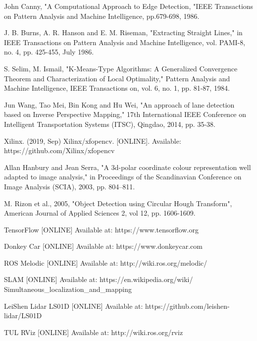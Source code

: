 \documentclass[conference]{IEEEtran}
\begin{document}
\begin{sloppypar}
\begin{thebibliography}{00}
 John Canny, "A Computational Approach to Edge Detection, "IEEE Transactions on Pattern Analysis and Machine Intelligence, pp.679-698, 1986.

 J. B. Burns, A. R. Hanson and E. M. Riseman, "Extracting Straight Lines," in IEEE Transactions on Pattern Analysis and Machine Intelligence, vol. PAMI-8, no. 4, pp. 425-455, July 1986.

 S. Selim, M. Ismail, "K-Means-Type Algorithms: A Generalized Convergence Theorem and Characterization of Local Optimality," Pattern Analysis and Machine Intelligence, IEEE Transactions on, vol. 6, no. 1, pp. 81-87, 1984. 

 Jun Wang, Tao Mei, Bin Kong and Hu Wei, "An approach of lane detection based on Inverse Perspective Mapping," 17th International IEEE Conference on Intelligent Transportation Systems (ITSC), Qingdao, 2014, pp. 35-38.

 Xilinx. (2019, Sep) Xilinx/xfopencv. [ONLINE]. Available:  https://github.com/Xilinx/xfopencv

 Allan Hanbury and Jean Serra, "A 3d-polar coordinate colour representation well adapted to image analysis," in Proceedings of the Scandinavian Conference on Image Analysis (SCIA), 2003, pp. 804–811.

 M. Rizon et al., 2005, "Object Detection using Circular Hough Transform", American Journal of Applied Sciences 2, vol 12, pp. 1606-1609.

 TensorFlow [ONLINE] Available at: https://www.tensorflow.org

 Donkey Car [ONLINE] Available at: https://www.donkeycar.com

 ROS Melodic [ONLINE] Available at: http://wiki.ros.org/melodic/

 SLAM [ONLINE] Available at: https://en.wikipedia.org/wiki/ Simultaneous\_localization\_and\_mapping

 LeiShen Lidar LS01D [ONLINE] Available at: https://github.com/leishen-lidar/LS01D

 TUL RViz [ONLINE] Available at: http://wiki.ros.org/rviz
\end{thebibliography}

\vspace{12pt}
\end{sloppypar}
\end{document}
